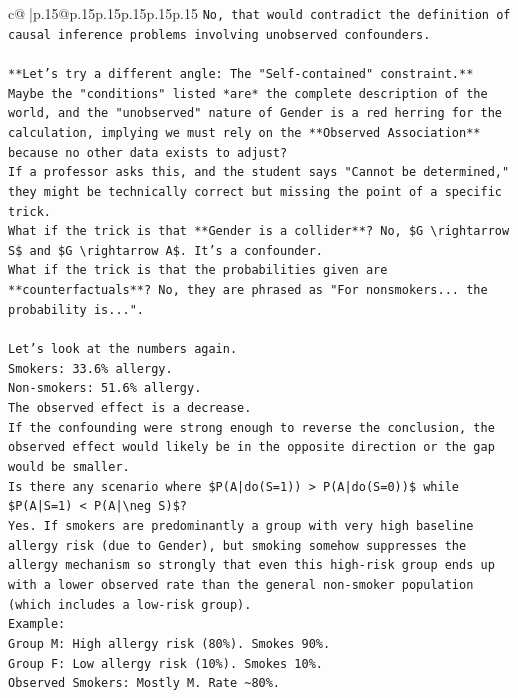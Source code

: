 \documentclass{article}
\begin{document}
{\begin{supertabular}{c@{$\;$}|p{.15\linewidth}@{}p{.15\linewidth}p{.15\linewidth}p{.15\linewidth}p{.15\linewidth}p{.15\linewidth}}
{{{\texttt{No, that would contradict the definition of causal inference problems involving unobserved confounders.} \\
\\ 
\texttt{**Let's try a different angle: The "Self{-}contained" constraint.**} \\
\texttt{Maybe the "conditions" listed *are* the complete description of the world, and the "unobserved" nature of Gender is a red herring for the calculation, implying we must rely on the **Observed Association** because no other data exists to adjust?} \\
\texttt{If a professor asks this, and the student says "Cannot be determined," they might be technically correct but missing the point of a specific trick.} \\
\texttt{What if the trick is that **Gender is a collider**? No, \$G \textbackslash{}rightarrow S\$ and \$G \textbackslash{}rightarrow A\$. It's a confounder.} \\
\texttt{What if the trick is that the probabilities given are **counterfactuals**? No, they are phrased as "For nonsmokers... the probability is...".} \\
\\ 
\texttt{Let's look at the numbers again.} \\
\texttt{Smokers: 33.6\% allergy.} \\
\texttt{Non{-}smokers: 51.6\% allergy.} \\
\texttt{The observed effect is a decrease.} \\
\texttt{If the confounding were strong enough to reverse the conclusion, the observed effect would likely be in the opposite direction or the gap would be smaller.} \\
\texttt{Is there any scenario where \$P(A|do(S=1)) > P(A|do(S=0))\$ while \$P(A|S=1) < P(A|\textbackslash{}neg S)\$?} \\
\texttt{Yes. If smokers are predominantly a group with very high baseline allergy risk (due to Gender), but smoking somehow suppresses the allergy mechanism so strongly that even this high{-}risk group ends up with a lower observed rate than the general non{-}smoker population (which includes a low{-}risk group).} \\
\texttt{Example:} \\
\texttt{Group M: High allergy risk (80\%). Smokes 90\%.} \\
\texttt{Group F: Low allergy risk (10\%). Smokes 10\%.} \\
\texttt{Observed Smokers: Mostly M. Rate \textasciitilde{}80\%.} \\
}}}
\end{supertabular}}
\end{document}
